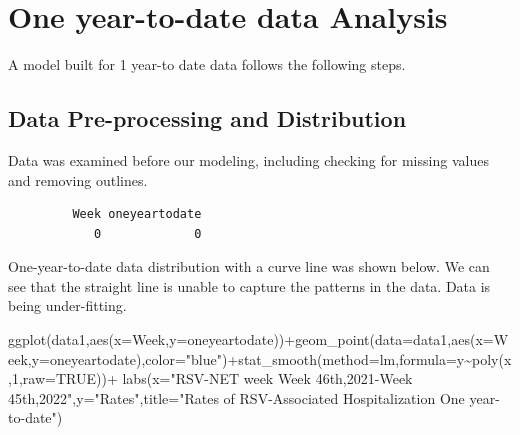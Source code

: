 \documentclass[
  letterpaper,
  DIV=11,
  numbers=noendperiod]{scrreport}
\newenvironment{Shaded}{\begin{snugshade}}{\end{snugshade}}
\newcommand{\AttributeTok}[1]{\textcolor[rgb]{0.40,0.45,0.13}{#1}}
\newcommand{\ConstantTok}[1]{\textcolor[rgb]{0.56,0.35,0.01}{#1}}
\newcommand{\DecValTok}[1]{\textcolor[rgb]{0.68,0.00,0.00}{#1}}
\newcommand{\FunctionTok}[1]{\textcolor[rgb]{0.28,0.35,0.67}{#1}}
\newcommand{\NormalTok}[1]{\textcolor[rgb]{0.00,0.23,0.31}{#1}}
\newcommand{\SpecialCharTok}[1]{\textcolor[rgb]{0.37,0.37,0.37}{#1}}
\newcommand{\StringTok}[1]{\textcolor[rgb]{0.13,0.47,0.30}{#1}}
\begin{document}
\hypertarget{one-year-to-date-data-analysis}{%
\section{One year-to-date data
Analysis}\label{one-year-to-date-data-analysis}}

A model built for 1 year-to date data follows the following steps.

\hypertarget{data-pre-processing-and-distribution}{%
\subsection{Data Pre-processing and
Distribution}\label{data-pre-processing-and-distribution}}

Data was examined before our modeling, including checking for missing
values and removing outlines.

\begin{verbatim}
         Week oneyeartodate 
            0             0 
\end{verbatim}

One-year-to-date data distribution with a curve line was shown below. We
can see that the straight line is unable to capture the patterns in the
data. Data is being under-fitting.

\begin{Shaded}
\begin{Highlighting}[]
\FunctionTok{ggplot}\NormalTok{(data1,}\FunctionTok{aes}\NormalTok{(}\AttributeTok{x=}\NormalTok{Week,}\AttributeTok{y=}\NormalTok{oneyeartodate))}\SpecialCharTok{+}\FunctionTok{geom\_point}\NormalTok{(}\AttributeTok{data=}\NormalTok{data1,}\FunctionTok{aes}\NormalTok{(}\AttributeTok{x=}\NormalTok{Week,}\AttributeTok{y=}\NormalTok{oneyeartodate),}\AttributeTok{color=}\StringTok{"blue"}\NormalTok{)}\SpecialCharTok{+}\FunctionTok{stat\_smooth}\NormalTok{(}\AttributeTok{method=}\NormalTok{lm,}\AttributeTok{formula=}\NormalTok{y}\SpecialCharTok{\textasciitilde{}}\FunctionTok{poly}\NormalTok{(x,}\DecValTok{1}\NormalTok{,}\AttributeTok{raw=}\ConstantTok{TRUE}\NormalTok{))}\SpecialCharTok{+}
  \FunctionTok{labs}\NormalTok{(}\AttributeTok{x=}\StringTok{"RSV{-}NET week Week 46th,2021{-}Week 45th,2022"}\NormalTok{,}\AttributeTok{y=}\StringTok{"Rates"}\NormalTok{,}\AttributeTok{title=}\StringTok{"Rates of RSV{-}Associated Hospitalization One year{-}to{-}date"}\NormalTok{)}
\end{Highlighting}
\end{Shaded}
\end{document}
